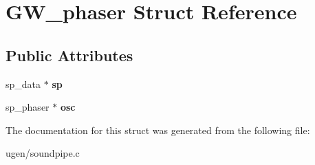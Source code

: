 \hypertarget{structGW__phaser}{}\section{G\+W\+\_\+phaser Struct Reference}
\label{structGW__phaser}
\subsection*{Public Attributes}
\begin{DoxyCompactItemize}
\item 
\hypertarget{structGW__phaser_ab764e7347b9727d3ed76f2b1a3bad561}{}\label{structGW__phaser_ab764e7347b9727d3ed76f2b1a3bad561} 
sp\+\_\+data $\ast$ {\bfseries sp}
\item 
\hypertarget{structGW__phaser_aed1b8733d935b358bb950795d87b3fc8}{}\label{structGW__phaser_aed1b8733d935b358bb950795d87b3fc8} 
sp\+\_\+phaser $\ast$ {\bfseries osc}
\end{DoxyCompactItemize}


The documentation for this struct was generated from the following file\+:\begin{DoxyCompactItemize}
\item 
ugen/soundpipe.\+c\end{DoxyCompactItemize}
